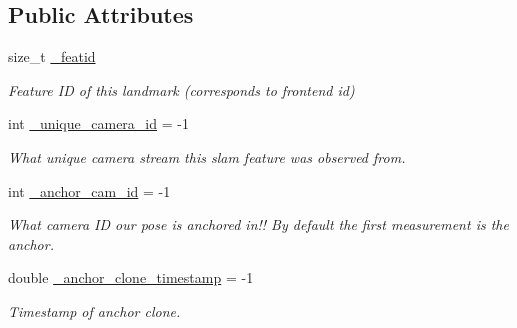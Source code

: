 \subsection*{Public Attributes}
\begin{DoxyCompactItemize}
\item 
\mbox{\label{classov__type_1_1Landmark_ad8e61393e2cf88ad04055081d93c1281}} 
size\+\_\+t \hyperlink{classov__type_1_1Landmark_ad8e61393e2cf88ad04055081d93c1281}{\+\_\+featid}
\begin{DoxyCompactList}\small\item\em Feature ID of this landmark (corresponds to frontend id) \end{DoxyCompactList}\item 
\mbox{\label{classov__type_1_1Landmark_a97b5c9a2110e0fad40eefcecb3f5fb14}} 
int \hyperlink{classov__type_1_1Landmark_a97b5c9a2110e0fad40eefcecb3f5fb14}{\+\_\+unique\+\_\+camera\+\_\+id} = -\/1
\begin{DoxyCompactList}\small\item\em What unique camera stream this slam feature was observed from. \end{DoxyCompactList}\item 
\mbox{\label{classov__type_1_1Landmark_acbc8b8af7f85c0dc123365046f1af432}} 
int \hyperlink{classov__type_1_1Landmark_acbc8b8af7f85c0dc123365046f1af432}{\+\_\+anchor\+\_\+cam\+\_\+id} = -\/1
\begin{DoxyCompactList}\small\item\em What camera ID our pose is anchored in!! By default the first measurement is the anchor. \end{DoxyCompactList}\item 
\mbox{\label{classov__type_1_1Landmark_a734c934cc4bf108ad228bd0f0596ef2a}} 
double \hyperlink{classov__type_1_1Landmark_a734c934cc4bf108ad228bd0f0596ef2a}{\+\_\+anchor\+\_\+clone\+\_\+timestamp} = -\/1
\begin{DoxyCompactList}\small\item\em Timestamp of anchor clone. \end{DoxyCompactList}\item 
\mbox{\label{classov__type_1_1Landmark_a8c2faa8e153b95606c9062527fdd029e}} 

\end{DoxyCompactItemize}

